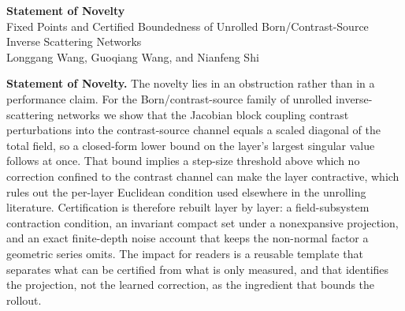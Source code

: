 \documentclass[11pt]{article}
\begin{document}
\begin{center}
{\Large\textbf{Statement of Novelty}}\\[1em]
\small{Fixed Points and Certified Boundedness of Unrolled Born/Contrast-Source Inverse Scattering Networks}\\[0.5em]
\small{Longgang Wang, Guoqiang Wang, and Nianfeng Shi}
\end{center}

\vspace{1em}

\noindent\textbf{Statement of Novelty.} The novelty lies in an obstruction rather than in a performance claim. For the Born/contrast-source family of unrolled inverse-scattering networks we show that the Jacobian block coupling contrast perturbations into the contrast-source channel equals a scaled diagonal of the total field, so a closed-form lower bound on the layer's largest singular value follows at once. That bound implies a step-size threshold above which no correction confined to the contrast channel can make the layer contractive, which rules out the per-layer Euclidean condition used elsewhere in the unrolling literature. Certification is therefore rebuilt layer by layer: a field-subsystem contraction condition, an invariant compact set under a nonexpansive projection, and an exact finite-depth noise account that keeps the non-normal factor a geometric series omits. The impact for readers is a reusable template that separates what can be certified from what is only measured, and that identifies the projection, not the learned correction, as the ingredient that bounds the rollout.
\end{document}
